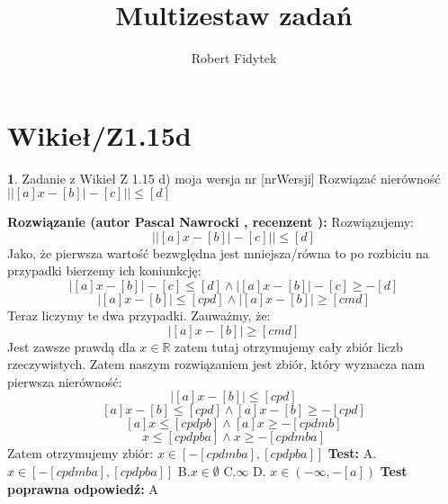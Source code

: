 \documentclass[12pt, a4paper]{article}
\title{Multizestaw zadań}
\author{Robert Fidytek}
\date{}
\theoremstyle{definition} %
\newtheorem{zad}{}
\newcommand{\kategoria}[1]{\section{#1}} %
\newcommand{\zadStart}[1]{\begin{zad}#1\newline} %
\newcommand{\zadStop}{\end{zad}}   %
\newcommand{\rozwStart}[2]{\noindent \textbf{Rozwiązanie (autor #1 , recenzent #2): }\newline} %
\newcommand{\odpStop}{\newline}                                             %
\newcommand{\testStart}{\noindent \textbf{Test:}\newline} %
\newcommand{\testStop}{\newline} %
\newcommand{\kluczStart}{\noindent \textbf{Test poprawna odpowiedź:}\newline} %
\newcommand{\kluczStop}{\newline} %
\begin{document}
\maketitle



\kategoria{Wikieł/Z1.15d}
\zadStart{Zadanie z Wikieł Z 1.15 d) moja wersja nr [nrWersji]}
Rozwiązać nierówność $\big||[a]x-[b]|-[c]|\big|\leq[d]$
\zadStop
\rozwStart{Pascal Nawrocki}{}
Rozwiązujemy:
$$\big||[a]x-[b]|-[c]|\big|\leq[d]$$
Jako, że pierwsza wartość bezwględna jest mniejsza/równa to po rozbiciu na przypadki bierzemy ich koniunkcję:
$$|[a]x-[b]|-[c]\leq[d] \wedge |[a]x-[b]|-[c]\geq-[d]$$
$$|[a]x-[b]|\leq[cpd] \wedge |[a]x-[b]|\geq[cmd]$$
Teraz liczymy te dwa przypadki. Zauważmy, że:
$$|[a]x-[b]|\geq[cmd]$$ Jest zawsze prawdą dla $x\in\mathbb{R}$ zatem tutaj otrzymujemy cały zbiór liczb rzeczywistych.
Zatem naszym rozwiązaniem jest zbiór, który wyznacza nam pierwsza nierówność:
$$|[a]x-[b]|\leq[cpd]$$
$$[a]x-[b]\leq[cpd]\wedge[a]x-[b]\geq-[cpd]$$
$$[a]x\leq[cpdpb]\wedge[a]x\geq-[cpdmb]$$
$$x\leq[cpdpba]\wedge x\geq-[cpdmba]$$
Zatem otrzymujemy zbiór: $x\in[-[cpdmba],[cpdpba]]$
\odpStop
\testStart
A.$x\in[-[cpdmba],[cpdpba]]$
B.$x\in \emptyset$
C.$\infty$
D. $x\in (-\infty,-[a])$
\testStop
\kluczStart
A
\kluczStop
\end{document}
